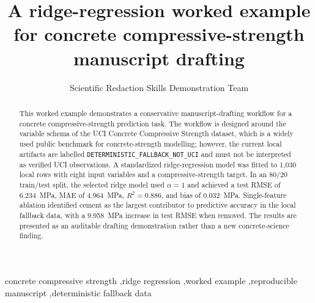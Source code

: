 \documentclass[10pt]{elsarticle}
\begin{document}
\begin{frontmatter}

\title{A ridge-regression worked example for concrete compressive-strength manuscript drafting}

\author[inst1]{Scientific Redaction Skills Demonstration Team}

\address[inst1]{Demonstration project, scientific-redaction-skills framework}


\begin{abstract}
This worked example demonstrates a conservative manuscript-drafting workflow for a concrete compressive-strength prediction task. The workflow is designed around the variable schema of the UCI Concrete Compressive Strength dataset, which is a widely used public benchmark for concrete-strength modelling; however, the current local artifacts are labelled \texttt{DETERMINISTIC\_FALLBACK\_NOT\_UCI} and must not be interpreted as verified UCI observations. A standardized ridge-regression model was fitted to 1,030 local rows with eight input variables and a compressive-strength target. In an 80/20 train/test split, the selected ridge model used \(\alpha = 1\) and achieved a test RMSE of 6.234~MPa, MAE of 4.964~MPa, \(R^2 = 0.886\), and bias of 0.032~MPa. Single-feature ablation identified cement as the largest contributor to predictive accuracy in the local fallback data, with a 9.958~MPa increase in test RMSE when removed. The results are presented as an auditable drafting demonstration rather than a new concrete-science finding.
\end{abstract}

\begin{keyword}
concrete compressive strength \sep ridge regression \sep worked example \sep reproducible manuscript \sep deterministic fallback data
\end{keyword}

\end{frontmatter}






\appendix


\begingroup
\footnotesize


\endgroup
\end{document}
